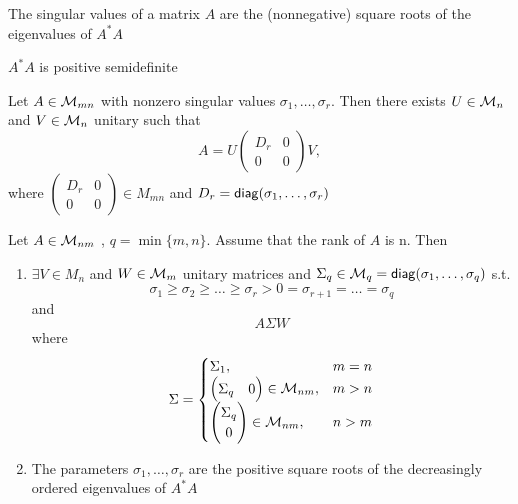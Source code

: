 \documentclass[aspectratio=169]{beamer}
\begin{document}
\begin{frame}
\begin{definition}
	The singular values of a matrix $A$ are the (nonnegative) square roots of the eigenvalues of $A^*A$
\end{definition}
\vfill
\begin{remark}
	$A^*A$ is positive semidefinite
\end{remark}
\end{frame}


\begin{frame}
\begin{theorem}[Zhang]\label{Theorem:ZhangSV}
	Let $A\in \mathcal{M}_{mn}$ with nonzero singular values $\sigma_1, \dots, \sigma_r$. Then there exists $U\in \mathcal{M}_n$ and $V \in \mathcal{M}_n$ unitary such that 
	\[A= U \begin{pmatrix}
	D_r& 0\\
	0& 0
	\end{pmatrix}V,\]
	where $\begin{pmatrix}
	D_r& 0\\
	0& 0
	\end{pmatrix}\in M_{mn}$ and $D_r= \mathsf{diag}(\sigma_1, \dots, \sigma_r)$
\end{theorem}
\end{frame}



\begin{frame}
\begin{theorem}[H \& J] Let $A\in \mathcal{M}_{nm}$ , $q= \min\{m,n\}$. Assume that the rank of $A$ is n. Then 
	\begin{enumerate}
		\item $\exists V \in M_{n}$ and $W \in \mathcal{M}_{m}$ unitary matrices and $\Sigma_q\in \mathcal{M}_q= \mathsf{diag}(\sigma_1, \dots, \sigma_q)$ s.t. 
		\[\sigma_1\geq \sigma_2 \geq \dots \geq \sigma_r > 0= \sigma_{r+1} = \dots = \sigma_q\]
		and
		\[A\Sigma W\]
		where 
		\[\Sigma= \begin{cases}
		\Sigma_1, & m=n\\
		\begin{pmatrix}
		\Sigma_q&
		0
		\end{pmatrix}\in \mathcal{M}_{nm},& m>n\\
		\begin{pmatrix}
		\Sigma_q\\
		0
		\end{pmatrix}\in \mathcal{M}_{nm},&  n>m
		\end{cases}
		\]
		\item The parameters $\sigma_1, \dots, \sigma_r$ are the positive square roots of the decreasingly ordered eigenvalues of $A^*A$
	\end{enumerate}
	
\end{theorem}
\end{frame}
\end{document}

